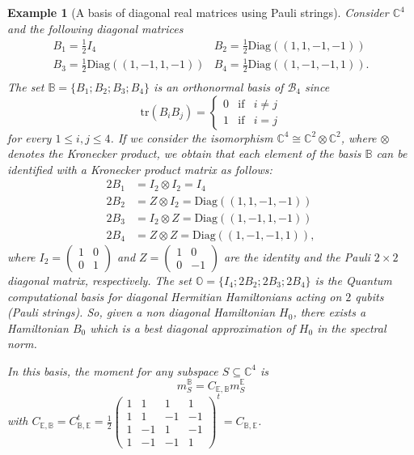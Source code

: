 \documentclass[12pt,a4paper]{article}
\def\C{\mathbb C}
\def\tr{\text{tr}}
\newtheorem{example}{Example}
\numberwithin{equation}{section}
\begin{document}
\begin{example} [A basis of diagonal real matrices using Pauli strings] \label{quantum ex}
	Consider $\C^4$ and the following diagonal matrices 
	\[\begin{array}{lll}
		B_1=\frac 12I_4&B_2=\frac 12\text{Diag}\left( (1,1,-1,-1)\right)\\		
		B_3=\frac 12\text{Diag}\left( (1,-1,1,-1)\right)&B_4=\frac 12\text{Diag}\left( (1,-1,-1,1)\right).\\
	\end{array}
	 \]
	The set $\mathbb{B}=\{B_1;B_2;B_3;B_4\}$ is an orthonormal basis of $\mathcal{B}_4$ since 
	\[\tr(B_iB_j)=\left\lbrace \begin{array}{lll}
		0&\text{if}& i\neq j\\
		1&\text{if}& i=j
	\end{array} \right. \]
	for every $1\leq i,j\leq 4$. 
		If we consider the isomorphism $\C^4\cong \C^2\otimes \C^2$, where $\otimes$ denotes the Kronecker product, we obtain that each element of the basis $\mathbb{B}$ can be identified with a Kronecker product matrix as follows:
	\begin{align*}
		2B_1&= I_2\otimes I_2= I_4\\
		2B_2&=Z\otimes I_2= \text{Diag}\left( (1,1,-1,-1)\right) \\
		2B_3&=I_2\otimes Z= \text{Diag}\left( (1,-1,1,-1)\right)\\
		2B_4&=Z\otimes Z= \text{Diag}\left( (1,-1,-1,1)\right),
	\end{align*}
	where $I_2=\begin{pmatrix}
		1&0\\
		0&1
	\end{pmatrix}$ and $Z=\begin{pmatrix}
		1&0\\
		0&-1
	\end{pmatrix}$ are the identity and the Pauli $2\times 2$ diagonal matrix, respectively. The set $\mathbb{O}=\{I_4;2B_2;2B_3;2B_4\}$ is the Quantum computational basis for diagonal Hermitian Hamiltonians acting on $2$ qubits (Pauli strings). So, given a non diagonal Hamiltonian $H_0$, there exists a Hamiltonian $B_0$ which is a best diagonal approximation of $H_0$ in the spectral norm.
	
	
	
	In this basis, the moment for any subspace $S\subseteq \C^4$ is
	\[m_S^{\mathbb{B}}=C_{\mathbb{E},\mathbb{B}}m_S^{\mathbb{E}}\]
	with $C_{\mathbb{E},\mathbb{B}}=C_{\mathbb{B},\mathbb{E}}^t= \frac 12\begin{pmatrix}
		1&1&1&1\\
		1&1&-1&-1\\
		1&-1&1&-1\\
		1&-1&-1&1
	\end{pmatrix}^t= C_{\mathbb{B},\mathbb{E}}$.
	

\end{example}
\end{document}
